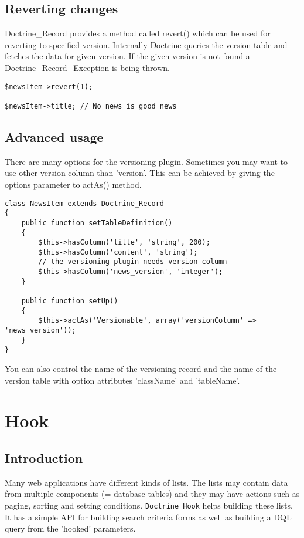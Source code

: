 \documentclass[11pt,a4paper]{report}
\begin{document}
\subsection{Reverting changes}
Doctrine\_Record provides a method called revert() which can be used for reverting to specified version. Internally Doctrine queries the version table and fetches the data for given version. If the given version is not found a Doctrine\_Record\_Exception is being thrown.

\begin{verbatim}
$newsItem->revert(1);

$newsItem->title; // No news is good news
\end{verbatim}

\subsection{Advanced usage}
There are many options for the versioning plugin. Sometimes you may want to use other version column than 'version'. This can be achieved by giving the options parameter to actAs() method.

\begin{verbatim}
class NewsItem extends Doctrine_Record
{
    public function setTableDefinition()
    {
        $this->hasColumn('title', 'string', 200);
        $this->hasColumn('content', 'string');
        // the versioning plugin needs version column
        $this->hasColumn('news_version', 'integer');
    }

    public function setUp()
    {
        $this->actAs('Versionable', array('versionColumn' => 'news_version'));
    }
}
\end{verbatim}

You can also control the name of the versioning record and the name of the version table with option attributes 'className' and 'tableName'.

\section{Hook}
\subsection{Introduction}
Many web applications have different kinds of lists. The lists may contain data from multiple components (= database tables) and they may have actions such as paging, sorting and setting conditions. \texttt{Doctrine\_Hook} helps building these lists. It has a simple API for building search criteria forms as well as building a DQL query from the 'hooked' parameters.
\end{document}
